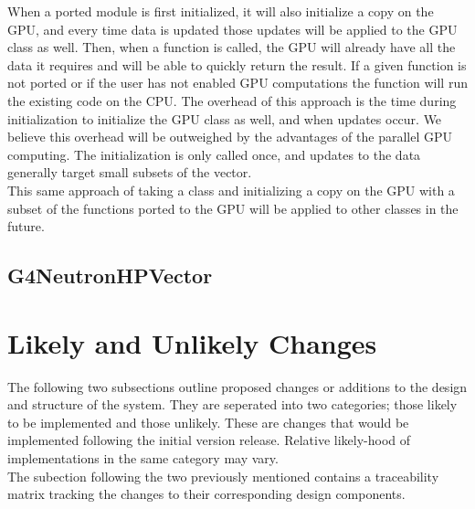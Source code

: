 \documentclass[12pt]{article}
\begin{document}
When a ported module is first initialized, it will also initialize a copy on the GPU, and every time data is updated those updates will be applied to the GPU class as well. Then, when a function is called, the GPU will already have all the data it requires and will be able to quickly return the result. If a given function is not ported or if the user has not enabled GPU computations the function will run the existing code on the CPU. The overhead of this approach is the time during initialization to initialize the GPU class as well, and when updates occur. We believe this overhead will be outweighed by the advantages of the parallel GPU computing. The initialization is only called once, and updates to the data generally target small subsets of the vector.\\

This same approach of taking a class and initializing a copy on the GPU with a subset of the functions ported to the GPU will be applied to other classes in the future.

\subsection{G4NeutronHPVector}\label{subsec_G4NeutronHPVector} %

\section{Likely and Unlikely Changes}
The following two subsections outline proposed changes or additions to the design and structure of the system. They are seperated into two categories; those likely to be implemented and those unlikely. These are changes that would be implemented following the initial version release. Relative likely-hood of implementations in the same category may vary. \\
The subection following the two previously mentioned contains a traceability matrix tracking the changes to their corresponding design components.
\end{document}
